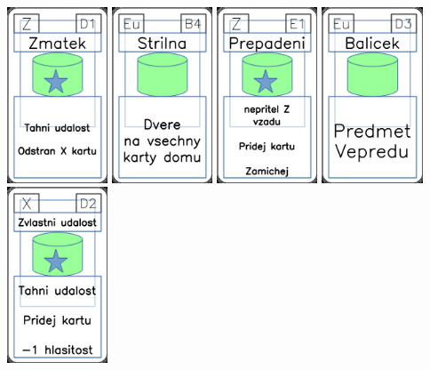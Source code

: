\documentclass[a4paper]{article}
\begin{document}
	\includegraphics[width=3.0cm]{img-5_45}
	\includegraphics[width=3.0cm]{img-4_38}
	\includegraphics[width=3.0cm]{img-5_50}
	\includegraphics[width=3.0cm]{img-4_17}
	\includegraphics[width=3.0cm]{img-5_16}
\end{document}
